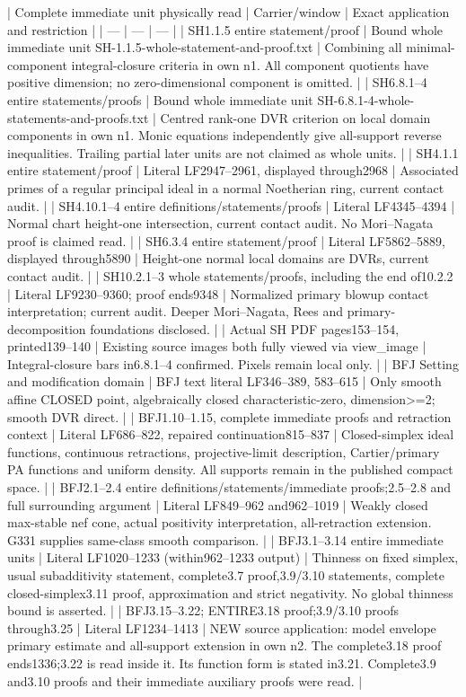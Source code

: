 \documentclass[11pt]{article}
\begin{document}
\begin{RetainedDATA}
| Complete immediate unit physically read | Carrier/window | Exact application and restriction |
| --- | --- | --- |
| SH1.1.5 entire statement/proof | Bound whole immediate unit SH-1.1.5-whole-statement-and-proof.txt | Combining all minimal-component integral-closure criteria in own n1. All component quotients have positive dimension; no zero-dimensional component is omitted. |
| SH6.8.1--4 entire statements/proofs | Bound whole immediate unit SH-6.8.1-4-whole-statements-and-proofs.txt | Centred rank-one DVR criterion on local domain components in own n1. Monic equations independently give all-support reverse inequalities. Trailing partial later units are not claimed as whole units. |
| SH4.1.1 entire statement/proof | Literal LF2947--2961, displayed through2968 | Associated primes of a regular principal ideal in a normal Noetherian ring, current contact audit. |
| SH4.10.1--4 entire definitions/statements/proofs | Literal LF4345--4394 | Normal chart height-one intersection, current contact audit. No Mori--Nagata proof is claimed read. |
| SH6.3.4 entire statement/proof | Literal LF5862--5889, displayed through5890 | Height-one normal local domains are DVRs, current contact audit. |
| SH10.2.1--3 whole statements/proofs, including the end of10.2.2 | Literal LF9230--9360; proof ends9348 | Normalized primary blowup contact interpretation; current audit. Deeper Mori--Nagata, Rees and primary-decomposition foundations disclosed. |
| Actual SH PDF pages153--154, printed139--140 | Existing source images both fully viewed via view_image | Integral-closure bars in6.8.1--4 confirmed. Pixels remain local only. |
| BFJ Setting and modification domain | BFJ text literal LF346--389, 583--615 | Only smooth affine CLOSED point, algebraically closed characteristic-zero, dimension>=2; smooth DVR direct. |
| BFJ1.10--1.15, complete immediate proofs and retraction context | Literal LF686--822, repaired continuation815--837 | Closed-simplex ideal functions, continuous retractions, projective-limit description, Cartier/primary PA functions and uniform density. All supports remain in the published compact space. |
| BFJ2.1--2.4 entire definitions/statements/immediate proofs;2.5--2.8 and full surrounding argument | Literal LF849--962 and962--1019 | Weakly closed max-stable nef cone, actual positivity interpretation, all-retraction extension. G331 supplies same-class smooth comparison. |
| BFJ3.1--3.14 entire immediate units | Literal LF1020--1233 (within962--1233 output) | Thinness on fixed simplex, usual subadditivity statement, complete3.7 proof,3.9/3.10 statements, complete closed-simplex3.11 proof, approximation and strict negativity. No global thinness bound is asserted. |
| BFJ3.15--3.22; ENTIRE3.18 proof;3.9/3.10 proofs through3.25 | Literal LF1234--1413 | NEW source application: model envelope primary estimate and all-support extension in own n2. The complete3.18 proof ends1336;3.22 is read inside it. Its function form is stated in3.21. Complete3.9 and3.10 proofs and their immediate auxiliary proofs were read. |


\end{RetainedDATA}
\end{document}
